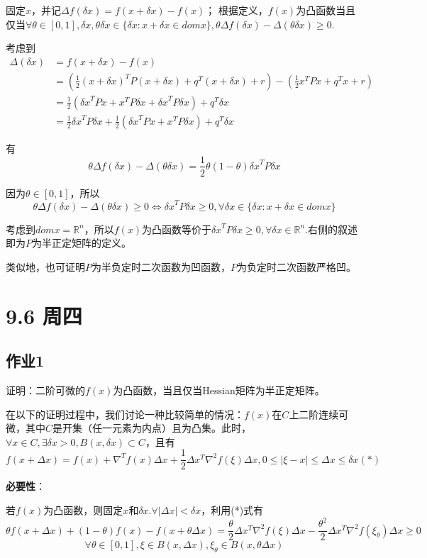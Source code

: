 \documentclass[11pt]{ctexart}
\begin{document}
固定$x$，并记$\Delta f(\delta x)=f(x+\delta x)-f(x)$；
根据定义，$f(x)$为凸函数当且仅当$\forall\theta\in[0, 1],\delta x,\theta\delta x\in\{\delta x:x+\delta x\in dom x\},\theta\Delta f(\delta x)-\Delta(\theta\delta x)\geq0$.

考虑到
\begin{align*}
\Delta(\delta x) & =f(x+\delta x)-f(x) \\
 & =(\frac{1}{2}{(x+\delta x)}^TP(x+\delta x)+q^T(x+\delta x)+r)-(\frac{1}{2}x^TPx+q^Tx+r) \\
 & =\frac{1}{2}({\delta x}^TPx+x^TP\delta x+{\delta x}^TP\delta x)+q^T\delta x \\
 & =\frac{1}{2}{\delta x}^TP\delta x+\frac{1}{2}({\delta x}^TPx+x^TP\delta x)+q^T\delta x
\end{align*}

有
$$\theta\Delta f(\delta x)-\Delta(\theta\delta x)=\frac{1}{2}\theta(1-\theta){\delta x}^TP\delta x$$

因为$\theta\in[0, 1]$，所以$$\theta\Delta f(\delta x)-\Delta(\theta\delta x)\geq0\Leftrightarrow{\delta x}^TP\delta x\geq 0, \forall\delta x\in\{\delta x:x+\delta x\in dom x\}$$

考虑到$dom x=\mathbb{R}^n$，所以$f(x)$为凸函数等价于${\delta x}^TP\delta x\geq 0, \forall\delta x\in\mathbb{R}^n$.右侧的叙述即为$P$为半正定矩阵的定义。

类似地，也可证明$P$为半负定时二次函数为凹函数，$P$为负定时二次函数严格凹。


\section*{9.6 周四}

\subsection*{作业1}

证明：二阶可微的$f(x)$为凸函数，当且仅当Hessian矩阵为半正定矩阵。

在以下的证明过程中，我们讨论一种比较简单的情况：$f(x)$在$C$上二阶连续可微，其中$C$是开集（任一元素为内点）且为凸集。此时，$\forall x\in C,\exists\delta x>0,B(x,\delta x)\subset C$，且有
$$f(x+\Delta x)=f(x)+\nabla^Tf(x)\Delta x+\frac{1}{2}\Delta x^T\nabla^2f(\xi)\Delta x,0\leq|\xi-x|\leq\Delta x\leq\delta x (*)$$

\textbf{必要性}：

若$f(x)$为凸函数，则固定$x$和$\delta x$.$\forall|\Delta x|<\delta x$，利用(*)式有
$$\theta f(x+\Delta x)+(1-\theta)f(x)-f(x+\theta\Delta x)=\frac{\theta}{2}\Delta x^T\nabla^2f(\xi)\Delta x-\frac{\theta^2}{2}\Delta x^T\nabla^2f(\xi_{\theta})\Delta x\geq0$$
$$\forall\theta\in[0,1],\xi\in B(x,\Delta x),\xi_{\theta}\in B(x,\theta\Delta x)$$
\end{document}
